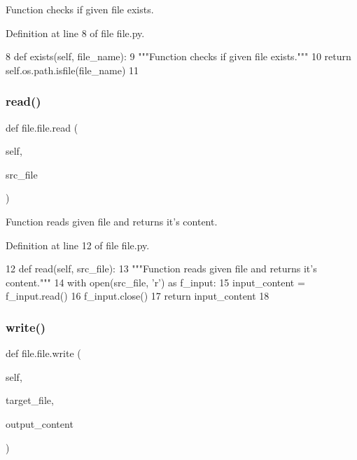 \begin{DoxyVerb}Function checks if given file exists.\end{DoxyVerb}
 

Definition at line 8 of file file.\+py.


\begin{DoxyCode}
8     \textcolor{keyword}{def }exists(self, file\_name):
9         \textcolor{stringliteral}{"""Function checks if given file exists."""}
10         \textcolor{keywordflow}{return} self.os.path.isfile(file\_name)
11 
\end{DoxyCode}
\mbox{\label{classfile_1_1file_a410aad2827c9bf0277194525bce39278}} 
\subsubsection{\texorpdfstring{read()}{read()}}
{\footnotesize\ttfamily def file.\+file.\+read (\begin{DoxyParamCaption}\item[{}]{self,  }\item[{}]{src\+\_\+file }\end{DoxyParamCaption})}

\begin{DoxyVerb}Function reads given file and returns it's content.\end{DoxyVerb}
 

Definition at line 12 of file file.\+py.


\begin{DoxyCode}
12     \textcolor{keyword}{def }read(self, src\_file):
13         \textcolor{stringliteral}{"""Function reads given file and returns it's content."""}
14         with open(src\_file, \textcolor{stringliteral}{'r') as f\_input:}
15 \textcolor{stringliteral}{            input\_content = f\_input.read()}
16 \textcolor{stringliteral}{            f\_input.close()}
17 \textcolor{stringliteral}{        }\textcolor{keywordflow}{return} input\_content
18 
\end{DoxyCode}
\mbox{\label{classfile_1_1file_af0444bd1572b6700fe4fd4f9b579a620}} 
\subsubsection{\texorpdfstring{write()}{write()}}
{\footnotesize\ttfamily def file.\+file.\+write (\begin{DoxyParamCaption}\item[{}]{self,  }\item[{}]{target\+\_\+file,  }\item[{}]{output\+\_\+content }\end{DoxyParamCaption})}

